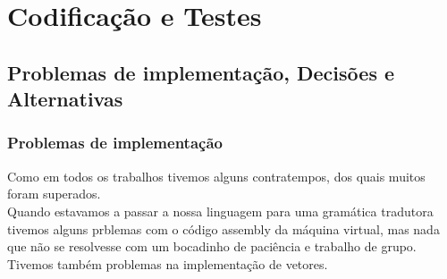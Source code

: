 \documentclass{report}
\begin{document}
\chapter{Codificação e Testes}
\section{Problemas de implementação, Decisões e Alternativas}
\subsection{Problemas de implementação}
\indent
Como em todos os trabalhos tivemos alguns contratempos, dos quais muitos foram superados.\\
\indent
Quando estavamos a passar a nossa linguagem para uma gramática tradutora tivemos alguns prblemas com o código assembly da máquina virtual, mas nada que não se resolvesse com um bocadinho de paciência e trabalho de grupo. Tivemos também problemas na implementação de vetores.   
   
\end{document}
